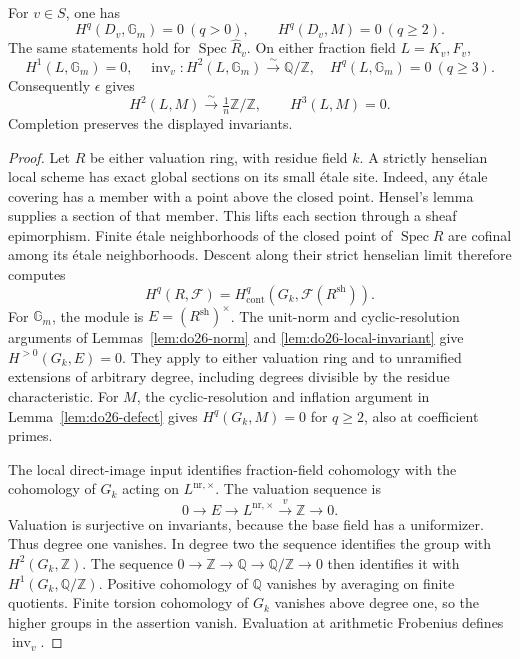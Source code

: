 \begin{lemma}
\label{lem:do27-local}
For \(v\in S\), one has
\[
 H^q(D_v,\mathbb G_m)=0\ (q>0),\qquad
 H^q(D_v,M)=0\ (q\geq2).
\]
The same statements hold for \(\operatorname{Spec}\widehat R_v\).
On either fraction field \(L=K_v,F_v\),
\[
 H^1(L,\mathbb G_m)=0,\quad
 \operatorname{inv}_v:H^2(L,\mathbb G_m)\xrightarrow{\sim}\mathbb Q/\mathbb Z,
 \quad H^q(L,\mathbb G_m)=0\ (q\geq3).
\]
Consequently \(\epsilon\) gives
\[
 H^2(L,M)\xrightarrow{\sim}\tfrac1n\mathbb Z/\mathbb Z,
 \qquad H^3(L,M)=0.
\]
Completion preserves the displayed invariants.
\end{lemma}

\begin{proof}
Let \(R\) be either valuation ring, with residue field \(k\).
A strictly henselian local scheme has exact global sections on its
small \'etale site. Indeed, any \'etale covering has a member with a
point above the closed point. Hensel's lemma supplies a section of
that member. This lifts each section through a sheaf epimorphism.
Finite \'etale neighborhoods of the closed point of
\(\operatorname{Spec}R\) are cofinal among its \'etale neighborhoods.
Descent along their strict henselian limit therefore computes
\[
 H^q(R,\mathcal F)=H^q_{\mathrm{cont}}
       (G_k,\mathcal F(R^{\mathrm{sh}})).
\]
For \(\mathbb G_m\), the module is
\(E=(R^{\mathrm{sh}})^\times\). The unit-norm and cyclic-resolution
arguments of Lemmas~\ref{lem:do26-norm} and
\ref{lem:do26-local-invariant} give \(H^{>0}(G_k,E)=0\).
They apply to either valuation ring and to unramified extensions of
arbitrary degree, including degrees divisible by the residue
characteristic. For \(M\), the cyclic-resolution and inflation
argument in Lemma~\ref{lem:do26-defect} gives
\(H^q(G_k,M)=0\) for \(q\geq2\), also at coefficient primes.

The local direct-image input identifies fraction-field cohomology
with the cohomology of \(G_k\) acting on
\(L^{\mathrm{nr},\times}\). The valuation sequence is
\[
 0\longrightarrow E\longrightarrow L^{\mathrm{nr},\times}
   \xrightarrow{v}\mathbb Z\longrightarrow0.
\]
Valuation is surjective on invariants, because the base field has a
uniformizer. Thus degree one vanishes. In degree two the sequence
identifies the group with \(H^2(G_k,\mathbb Z)\).
The sequence \(0\to\mathbb Z\to\mathbb Q\to\mathbb Q/\mathbb Z\to0\)
then identifies it with \(H^1(G_k,\mathbb Q/\mathbb Z)\).
Positive cohomology of \(\mathbb Q\) vanishes by averaging on finite
quotients. Finite torsion cohomology of \(G_k\) vanishes above degree
one, so the higher groups in the assertion vanish.
Evaluation at arithmetic Frobenius defines \(\operatorname{inv}_v\).


\end{proof}
